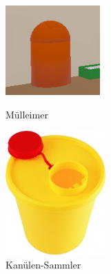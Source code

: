 \begin{figure}[ht]
\begin{minipage}[t]{0.48\linewidth}
\centering
\includegraphics[width=\textwidth]{images/muelleimmer.png}
\caption[Skillslab WebVR]{Mülleimer}
\end{minipage}
\hspace{0.5cm}
\begin{minipage}[t]{0.48\linewidth}
\includegraphics[width=\textwidth]{images/kanueleSammler.jpg}
\caption[Skillslab WebVR]{Kanülen-Sammler}
\end{minipage}
\end{figure}

